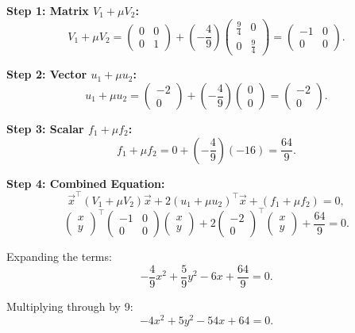 \documentclass[journal]{IEEEtran}
\begin{document}
\textbf{Step 1: Matrix \( V_1 + \mu V_2 \):}
\[
V_1 + \mu V_2 = \begin{pmatrix} 0 & 0 \\ 0 & 1 \end{pmatrix} + \left(-\frac{4}{9}\right) \begin{pmatrix} \frac{9}{4} & 0 \\ 0 & \frac{9}{4} \end{pmatrix} = \begin{pmatrix} -1 & 0 \\ 0 & 0 \end{pmatrix}.
\]

\textbf{Step 2: Vector \( u_1 + \mu u_2 \):}
\[
u_1 + \mu u_2 = \begin{pmatrix} -2 \\ 0 \end{pmatrix} + \left(-\frac{4}{9}\right) \begin{pmatrix} 0 \\ 0 \end{pmatrix} = \begin{pmatrix} -2 \\ 0 \end{pmatrix}.
\]

\textbf{Step 3: Scalar \( f_1 + \mu f_2 \):}
\[
f_1 + \mu f_2 = 0 + \left(-\frac{4}{9}\right)(-16) = \frac{64}{9}.
\]

\textbf{Step 4: Combined Equation:}
\[
\vec{x}^\top (V_1 + \mu V_2) \vec{x} + 2 (u_1 + \mu u_2)^\top \vec{x} + (f_1 + \mu f_2) = 0,
\]
\[
\begin{pmatrix} x \\ y \end{pmatrix}^\top \begin{pmatrix} -1 & 0 \\ 0 & 0 \end{pmatrix} \begin{pmatrix} x \\ y \end{pmatrix} + 2 \begin{pmatrix} -2 \\ 0 \end{pmatrix}^\top \begin{pmatrix} x \\ y \end{pmatrix} + \frac{64}{9} = 0.
\]

Expanding the terms:
\[
-\frac{4}{9}x^2 + \frac{5}{9}y^2 - 6x + \frac{64}{9} = 0.
\]

Multiplying through by 9:
\[
-4x^2 + 5y^2 - 54x + 64 = 0.
\]
\end{document}
